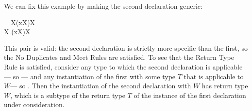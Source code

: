 \documentclass[10pt]{sigplanconf}
\newcommand{\TODO}[1]{\textbf{\emph{\textcolor{red}{TODO}}}: \textsf{\footnotesize #1}}
\begin{document}
We can fix this example by making the second declaration generic:

\small
\begin{FortressCode}
{\tt ~~}\+\llbracket{}X\rrbracket(x\COLON X)\COLON X \\
  \llbracket{}X \SHORTCUT{<} \rrbracket(x\COLON X)\COLON X\-
\end{FortressCode}
\normalsize
This pair is valid: 
the second declaration is strictly more specific than the first, 
so the No Duplicates and Meet Rules are satisfied.
To see that the Return Type Rule is satisfied, 
consider any type  to which the second declaration is applicable---%
so ---%
and any instantiation of the first with some type $T$ that is applicable to $W$---%
so .
Then the instantiation of the second declaration with $W$ 
has return type $W$, which is a subtype of the return type $T$ 
of the instance of the first declaration under consideration.










\end{document}
